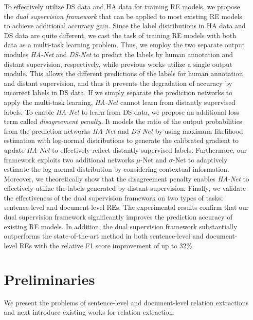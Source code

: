 \documentclass[11pt]{article}
\newcommand{\hanet}{\emph{HA-Net}\xspace}
\newcommand{\dsnet}{\emph{DS-Net}\xspace}
\newcommand{\munet}{$\mu$-Net\xspace}
\newcommand{\sigmanet}{$\sigma$-Net\xspace}
\begin{document}
To effectively utilize DS data and HA data for training RE models, we propose the \emph{dual supervision framework} that can be applied to most existing RE models to achieve additional accuracy gain.
Since the label distributions in HA data and DS data are quite different, we cast the task of training RE models with both data as a multi-task learning problem.
Thus, we employ the two separate output modules \hanet and \dsnet to predict the labels by human annotation and distant supervision, respectively, while previous works utilize a single output module.
This allows the different predictions of the labels for human annotation and distant supervision, and thus it prevents the degradation of accuracy by incorrect labels in DS data.
If we simply separate the prediction networks to apply the multi-task learning, \hanet cannot learn from distantly supervised labels.
To enable \hanet to learn from DS data, we propose an additional loss term called \emph{disagreement penalty}.
It models the ratio of the output probabilities from the prediction networks \hanet and \dsnet by using maximum likelihood estimation with log-normal distributions to generate the calibrated gradient to update \hanet to effectively reflect distantly supervised labels. 
Furthermore, our framework exploits two additional networks \munet and \sigmanet to adaptively estimate the log-normal distribution by considering contextual information.
Moreover, we theoretically show that the disagreement penalty enables \hanet to effectively utilize the labels generated by distant supervision.
Finally, we validate the effectiveness of the dual supervision framework on two types of tasks: sentence-level and document-level REs.
The experimental results confirm that our dual supervision framework significantly improves the prediction accuracy of existing RE models. 
In addition, the dual supervision framework substantially outperforms the state-of-the-art method \cite{ye2019looking} in both sentence-level and document-level REs with the relative F1 score improvement of up to 32\%.





















 \section{Preliminaries}
\label{sec:preliminaries}
We present the problems of sentence-level and document-level relation extractions and next introduce existing works for relation extraction.
\end{document}
